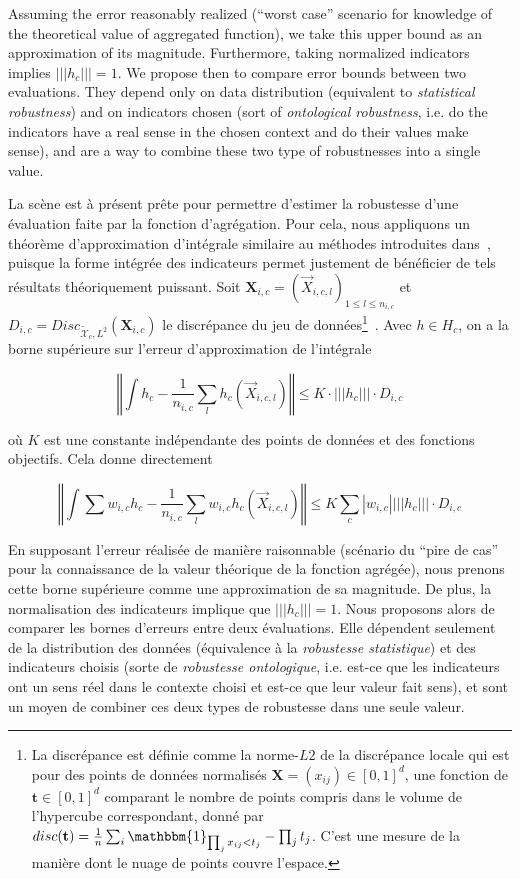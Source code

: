 {Assuming the error reasonably realized (``worst case'' scenario for knowledge of the theoretical value of aggregated function), we take this upper bound as an approximation of its magnitude. Furthermore, taking normalized indicators implies $\left|\left|\left|h_c\right|\right|\right| = 1$. We propose then to compare error bounds between two evaluations. They depend only on data distribution (equivalent to \emph{statistical robustness}) and on indicators chosen (sort of \emph{ontological robustness}, i.e. do the indicators have a real sense in the chosen context and do their values make sense), and are a way to combine these two type of robustnesses into a single value.
}{
La scène est à présent prête pour permettre d'estimer la robustesse d'une évaluation faite par la fonction d'agrégation. Pour cela, nous appliquons un théorème d'approximation d'intégrale similaire au méthodes introduites dans~\cite{varet2010developpement}, puisque la forme intégrée des indicateurs permet justement de bénéficier de tels résultats théoriquement puissant. Soit $\mathbf{X}_{i,c}=(\vec{X}_{i,c,l})_{1\leq l\leq n_{i,c}}$ et $D_{i,c}=Disc_{\tilde{\mathcal{X}}_{c},L^2}(\mathbf{X}_{i,c})$ le discrépance du jeu de données\footnote{La discrépance est définie comme la norme-$L2$ de la discrépance locale qui est pour des points de données normalisés $\mathbf{X}=(x_{ij})\in \left[0,1\right]^d$, une fonction de $\mathbf{t}\in \left[0,1\right]^d$ comparant le nombre de points compris dans le volume de l'hypercube correspondant, donné par $disc(\mathbf{t}) = \frac{1}{n}\sum_i \mathbbm{1}_{\prod_j x_{ij}<t_j} - \prod_j t_j$. C'est une mesure de la manière dont le nuage de points couvre l'espace.}~\cite{niederreiter1972discrepancy}. Avec $h\in H_{c}$, on a la borne supérieure sur l'erreur d'approximation de l'intégrale

\[
\left\Vert \int h_{c}-\frac{1}{n_{i,c}}\sum_{l}h_{c}(\vec{X}_{i,c,l})\right\Vert \leq K\cdot\left|\left|\left|h_{c}\right|\right|\right|\cdot D_{i,c}
\]

où $K$ est une constante indépendante des points de données et des fonctions objectifs. Cela donne directement

\[
\left\Vert \int\sum w_{i,c}h_{c}-\frac{1}{n_{i,c}}\sum_{l}w_{i,c}h_{c}(\vec{X}_{i,c,l})\right\Vert \leq K\sum_{c}\left|w_{i,c}\right|\left|\left|\left|h_{c}\right|\right|\right|\cdot D_{i,c}
\]


En supposant l'erreur réalisée de manière raisonnable (scénario du ``pire de cas'' pour la connaissance de la valeur théorique de la fonction agrégée), nous prenons cette borne supérieure comme une approximation de sa magnitude. De plus, la normalisation des indicateurs implique que $\left|\left|\left|h_c\right|\right|\right| = 1$. Nous proposons alors de comparer les bornes d'erreurs entre deux évaluations. Elle dépendent seulement de la distribution des données (équivalence à la \emph{robustesse statistique}) et des indicateurs choisis (sorte de \emph{robustesse ontologique}, i.e. est-ce que les indicateurs ont un sens réel dans le contexte choisi et est-ce que leur valeur fait sens), et sont un moyen de combiner ces deux types de robustesse dans une seule valeur.

}


